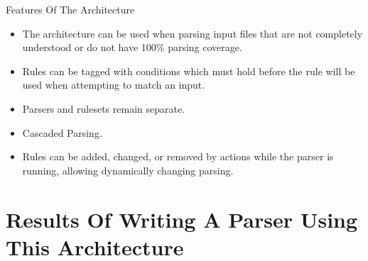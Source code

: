 \documentclass{beamer}
\newcommand{\timingnote}[1]{%
}
\begin{document}
\begin{frame}{Features Of The Architecture}

    \timingnote{2 minutes}

    \begin{itemize}

        \item The architecture can be used when parsing input files that
            are not completely understood or do not have 100\% parsing
            coverage.  \timingnote{Emphasise this.}

        \item Rules can be tagged with conditions which must hold before
            the rule will be used when attempting to match an input.
            \timingnote{Simple, but could be extended as necessary.}

        \item Parsers and rulesets remain separate.

        \item Cascaded Parsing.

        \item Rules can be added, changed, or removed by actions while the
            parser is running, allowing dynamically changing parsing.
            \timingnote{Currying functions in a calculator might be a good
            example.}

    \end{itemize}

\end{frame}


\section{Results Of Writing A Parser Using This Architecture}
\end{document}
